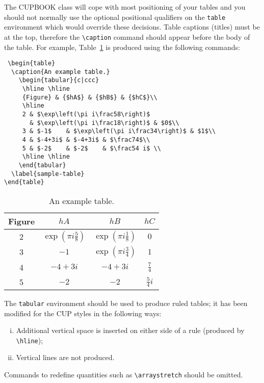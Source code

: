 \documentclass[cup6a]{cupbook}
\begin{document}
The CUPBOOK class will cope with most positioning of your tables and
you should not normally use the optional positional qualifiers on the
\verb"table" environment which would override these decisions.
 Table captions (titles) must be at the top, therefore the
\verb"\caption" command should appear before the body of the table.
 For example, Table~\ref{sample-table} is produced using the following
commands:
 \begin{verbatim}
 \begin{table}
  \caption{An example table.}
    \begin{tabular}{c|ccc}
     \hline \hline
     {Figure} & {$hA$} & {$hB$} & {$hC$}\\
     \hline
     2 & $\exp\left(\pi i\frac58\right)$
       & $\exp\left(\pi i\frac18\right)$ & $0$\\
     3 & $-1$    & $\exp\left(\pi i\frac34\right)$ & $1$\\
     4 & $-4+3i$ & $-4+3i$ & $\frac74$\\
     5 & $-2$    & $-2$    & $\frac54 i$ \\
     \hline \hline
    \end{tabular}
  \label{sample-table}
\end{table}
\end{verbatim}
 \begin{table}
  \caption{An example table.}
    \begin{tabular}{c|ccc}
     \hline \hline
     {Figure} & {$hA$} & {$hB$} & {$hC$}\\
     \hline
     2 & $\exp\left(\pi i\frac58\right)$
       & $\exp\left(\pi i\frac18\right)$ & $0$\\
     3 & $-1$    & $\exp\left(\pi i\frac34\right)$ & $1$\\
     4 & $-4+3i$ & $-4+3i$ & $\frac74$\\
     5 & $-2$    & $-2$    & $\frac54 i$ \\
     \hline \hline
    \end{tabular}
  \label{sample-table}
 \end{table}
 The \verb"tabular" environment should be used to produce ruled tables;
it has been modified for the CUP styles in the following ways:
 \begin{enumerate}[(ii)]\listsize
  \item Additional vertical space is inserted on either side of a rule
        (produced by \verb"\hline");
  \item Vertical lines are not produced.
 \end{enumerate}
 Commands to redefine quantities such as \verb"\arraystretch" should be
omitted.
\end{document}
